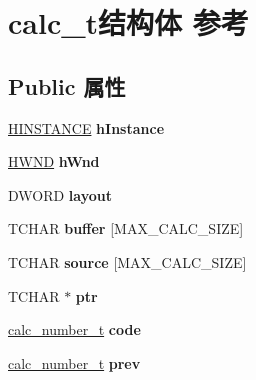 \hypertarget{structcalc__t}{}\section{calc\+\_\+t结构体 参考}
\label{structcalc__t}
\subsection*{Public 属性}
\begin{DoxyCompactItemize}
\item 
\mbox{\label{structcalc__t_a0670c526d0bedb2b58cf5f61f8a6d14b}} 
\hyperlink{interfacevoid}{H\+I\+N\+S\+T\+A\+N\+CE} {\bfseries h\+Instance}
\item 
\mbox{\label{structcalc__t_a0005826f8ecdb6b5dc5b12d8b93806a3}} 
\hyperlink{interfacevoid}{H\+W\+ND} {\bfseries h\+Wnd}
\item 
\mbox{\label{structcalc__t_a280a77df1bdc4ee6bcca81780819aa3d}} 
D\+W\+O\+RD {\bfseries layout}
\item 
\mbox{\label{structcalc__t_a5482e9b6427ae839f1b3dcc886f288b0}} 
T\+C\+H\+AR {\bfseries buffer} \mbox{[}M\+A\+X\+\_\+\+C\+A\+L\+C\+\_\+\+S\+I\+ZE\mbox{]}
\item 
\mbox{\label{structcalc__t_ace96f66b61485053014ff47fde9e4fd1}} 
T\+C\+H\+AR {\bfseries source} \mbox{[}M\+A\+X\+\_\+\+C\+A\+L\+C\+\_\+\+S\+I\+ZE\mbox{]}
\item 
\mbox{\label{structcalc__t_add8a064cee98c382182e44f7392faaee}} 
T\+C\+H\+AR $\ast$ {\bfseries ptr}
\item 
\mbox{\label{structcalc__t_a7019759ce45a7ab035e39a5b25eaee8b}} 
\hyperlink{unioncalc__number__t}{calc\+\_\+number\+\_\+t} {\bfseries code}
\item 
\mbox{\label{structcalc__t_a9c91ac537214416c8dd5c530f82536c4}} 
\hyperlink{unioncalc__number__t}{calc\+\_\+number\+\_\+t} {\bfseries prev}
\item 
\mbox{\label{structcalc__t_a2bc5a2ed5b7ef62b1b10ce3930a6a324}} 

\end{DoxyCompactItemize}
